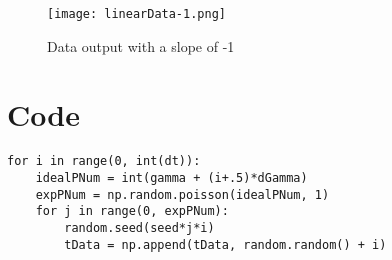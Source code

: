 \documentclass[aps,letterpaper,10pt]{revtex4}
\begin{document}
\begin{figure}[h!]
\begin{center} \texttt{[image: linearData-1.png]} \caption{Data output with a slope of -1} \end{center}
\vspace{3mm}
\end{figure}

\section{Code}

\begin{verbatim}
for i in range(0, int(dt)):
    idealPNum = int(gamma + (i+.5)*dGamma)
    expPNum = np.random.poisson(idealPNum, 1)
    for j in range(0, expPNum):
        random.seed(seed*j*i)
        tData = np.append(tData, random.random() + i)
\end{verbatim}
\end{document}
